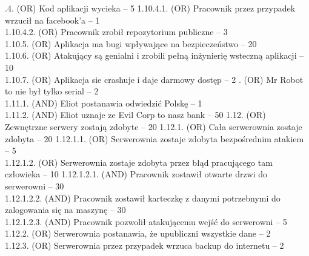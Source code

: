 \documentclass[10pt,a4paper,twoside]{article}
\newenvironment{subs}
{\adjustwidth{3em}{0pt}}
{\endadjustwidth}
\begin{document}
\begin{subs}
\begin{subs}
\begin{subs}
            \end{subs}
            1.10.4. (OR) Kod aplikacji wycieka -- 5
            \begin{subs}
                1.10.4.1. (OR) Pracownik przez przypadek wrzucił na facebook'a -- 1\\
                1.10.4.2. (OR) Pracownik zrobił repozytorium publiczne -- 3 \\
            \end{subs}
            1.10.5. (OR) Aplikacja ma bugi wpływające na bezpieczeństwo -- 20 \\
            1.10.6. (OR) Atakujący są genialni i zrobili pełną inżynierię wsteczną aplikacji -- 10 \\
            1.10.7. (OR) Aplikacja sie crashuje i daje darmowy dostęp -- 2
        \end{subs}
        1.11. (OR) Mr Robot to nie był tylko serial -- 2 \\
        \begin{subs}
            1.11.1. (AND) Eliot postanawia odwiedzić Polskę -- 1 \\
            1.11.2. (AND) Eliot uznaje ze Evil Corp to nasz bank -- 50
        \end{subs}
        1.12. (OR) Zewnętrzne serwery zostają zdobyte -- 20
        \begin{subs}
            1.12.1. (OR) Cała serwerownia zostaje zdobyta -- 20
            \begin{subs}
                1.12.1.1. (OR) Serwerownia zostaje zdobyta bezpośrednim atakiem -- 5 \\
                1.12.1.2. (OR) Serwerownia zostaje zdobyta przez błąd pracującego tam człowieka -- 10
                \begin{subs}
                    1.12.1.2.1. (AND) Pracownik zostawił otwarte drzwi do serwerowni -- 30 \\
                    1.12.1.2.2. (AND) Pracownik zostawił karteczkę z danymi potrzebnymi do zalogowania się na maszynę -- 30 \\
                    1.12.1.2.3. (AND) Pracownik pozwolił atakującemu wejść do serwerowni -- 5
                \end{subs}
            \end{subs}
            1.12.2. (OR) Serwerownia postanawia, że upubliczni wszystkie dane -- 2 \\
            1.12.3. (OR) Serwerownia przez przypadek wrzuca backup do internetu -- 2 \\

\end{subs}
\end{subs}
\end{document}

